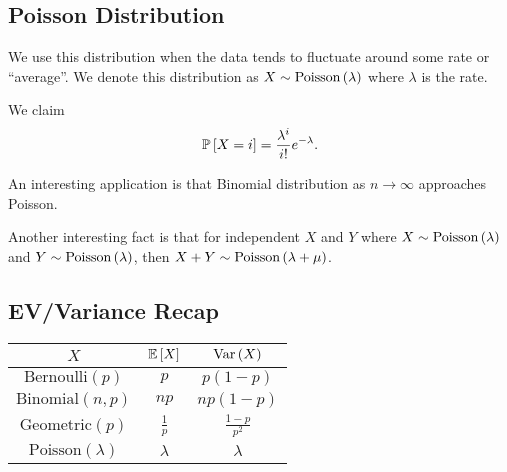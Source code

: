 \subsection{Poisson Distribution}
We use this distribution when the data tends to fluctuate around some rate or ``average''. We denote this distribution as $X \sim \text{Poisson}\left( \lambda \right)$ where $\lambda$ is the rate. 

We claim \[ \mathbb{P}\left[ X = i \right] = \dfrac{{\lambda}^{i}}{i !} e^{- {\lambda}}. \]

An interesting application is that Binomial distribution as $n \to \infty$ approaches Poisson.

Another interesting fact is that for independent $X$ and $Y$ where $X \sim \text{Poisson}\left( \lambda \right)$ and $Y \sim \text{Poisson}\left( \lambda \right)$, then $X+Y \sim \text{Poisson}\left( \lambda + \mu \right)$.  

\subsection{EV/Variance Recap}

\begin{center}
    \begin{tabular}{|c|c|c|}
        \hline 
        $X$ & $\mathbb{E}\left[ X \right]$ & $\text{Var}\left( X \right)$ \\
        \hline
        $\text{Bernoulli}(p)$ & $p$ & $p(1-p)$ \\
        \hline
        $\text{Binomial}(n,p)$ & $np$ & $np(1-p)$ \\
        \hline
        $\text{Geometric}(p)$ & $\frac{1}{p}$ & $\frac{1-p}{p^2}$ \\
        \hline
        $\text{Poisson}(\lambda)$ & $\lambda$ & $\lambda$ \\
        \hline
    \end{tabular}
\end{center}